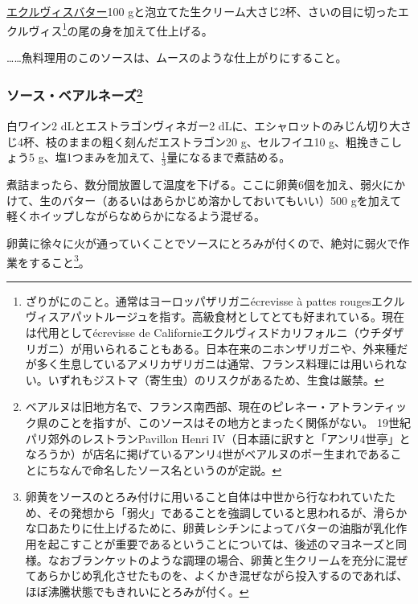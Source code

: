 \begin{recette}
\protect\hyperlink{beurre-d-ecrevisse}{エクルヴィスバター}100
gと泡立てた生クリーム大さじ2杯、さいの目に切ったエクルヴィス\footnote{ざりがにのこと。通常はヨーロッパザリガニécrevisse
  à pattes
  rougesエクルヴィスアパットルージュを指す。高級食材としてとても好まれている。現在は代用としてécrevisse
  de
  Californieエクルヴィスドカリフォルニ（ウチダザリガニ）が用いられることもある。日本在来のニホンザリガニや、外来種だが多く生息しているアメリカザリガニは通常、フランス料理には用いられない。いずれもジストマ（寄生虫）のリスクがあるため、生食は厳禁。}の尾の身を加えて仕上げる。

\ldots{}\ldots{}魚料理用のこのソースは、ムースのような仕上がりにすること。

\hypertarget{sauce-bearnaise}{%
\subsubsection[ソース・ベアルネーズ]{\texorpdfstring{ソース・ベアルネーズ\footnote{ベアルヌは旧地方名で、フランス南西部、現在のピレネー・アトランティック県のことを指すが、このソースはその地方とまったく関係がない。
  19世紀パリ郊外のレストランPavillon Henri
  IV（日本語に訳すと「アンリ4世亭」となろうか）が店名に掲げているアンリ4世がベアルヌのポー生まれであることにちなんで命名したソース名というのが定説。}}{ソース・ベアルネーズ}}\label{sauce-bearnaise}}



白ワイン2 dLとエストラゴンヴィネガー2
dLに、エシャロットのみじん切り大さじ4杯、枝のままの粗く刻んだエストラゴン20
g、セルフイユ10 g、粗挽きこしょう5
g、塩1つまみを加えて、\(\frac{1}{3}\)量になるまで煮詰める。

煮詰まったら、数分間放置して温度を下げる。ここに卵黄6個を加え、弱火にかけて、生のバター（あるいはあらかじめ溶かしておいてもいい）500
gを加えて軽くホイップしながらなめらかになるよう混ぜる。

卵黄に徐々に火が通っていくことでソースにとろみが付くので、絶対に弱火で作業をすること\footnote{卵黄をソースのとろみ付けに用いること自体は中世から行なわれていたため、その発想から「弱火」であることを強調していると思われるが、滑らかな口あたりに仕上げるために、卵黄レシチンによってバターの油脂が乳化作用を起こすことが重要であるということについては、後述のマヨネーズと同様。なおブランケットのような調理の場合、卵黄と生クリームを充分に混ぜてあらかじめ乳化させたものを、よくかき混ぜながら投入するのであれば、ほぼ沸騰状態でもきれいにとろみが付く。}。


\end{recette}
